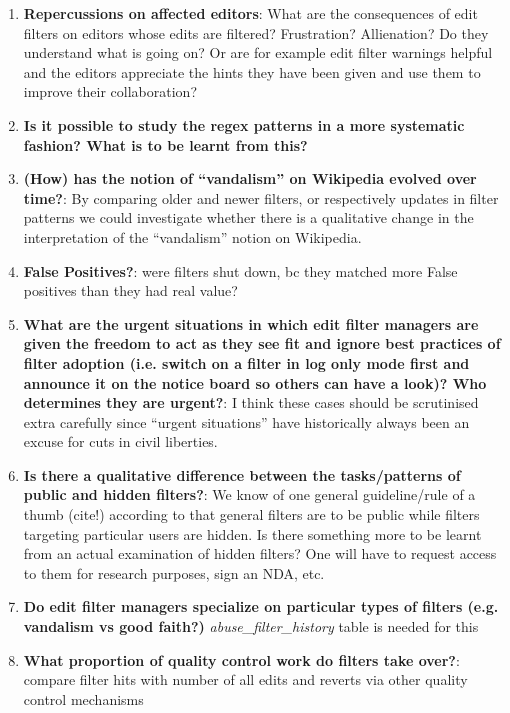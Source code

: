 \begin{enumerate}
    \item \textbf{Repercussions on affected editors}: What are the consequences of edit filters on editors whose edits are filtered? Frustration? Allienation? Do they understand what is going on? Or are for example edit filter warnings helpful and the editors appreciate the hints they have been given and use them to improve their collaboration?
\begin{comment}
Users are urged to use the term "vandalism" carefully, since it tends to offend and drive people away.
("When editors are editing in good faith, mislabeling their edits as vandalism makes them less likely to respond to corrective advice or to engage collaboratively during a disagreement,"~\cite{Wikipedia:Vandalism})
There are also various complaints/comments by users bewildered that their edits appear on an ``abuse log''
\end{comment}
    \item \textbf{Is it possible to study the regex patterns in a more systematic fashion? What is to be learnt from this?}%
    \item \textbf{(How) has the notion of ``vandalism'' on Wikipedia evolved over time?}: By comparing older and newer filters, or respectively updates in filter patterns we could investigate whether there is a qualitative change in the interpretation of the ``vandalism'' notion on Wikipedia.
    \item \textbf{False Positives?}: were filters shut down, bc they matched more False positives than they had real value?
    \item \textbf{What are the urgent situations in which edit filter managers are given the freedom to act as they see fit and ignore best practices of filter adoption (i.e. switch on a filter in log only mode first and announce it on the notice board so others can have a look)? Who determines they are urgent?}: I think these cases should be scrutinised extra carefully since ``urgent situations'' have historically always been an excuse for cuts in civil liberties.
    \item \textbf{Is there a qualitative difference between the tasks/patterns of public and hidden filters?}: We know of one general guideline/rule of a thumb (cite!) according to that general filters are to be public while filters targeting particular users are hidden. Is there something more to be learnt from an actual examination of hidden filters? One will have to request access to them for research purposes, sign an NDA, etc.
    \item \textbf{Do edit filter managers specialize on particular types of filters (e.g. vandalism vs good faith?)} \emph{abuse\_filter\_history } table is needed for this
    \item \textbf{What proportion of quality control work do filters take over?}: compare filter hits with number of all edits and reverts via other quality control mechanisms
\end{enumerate}
